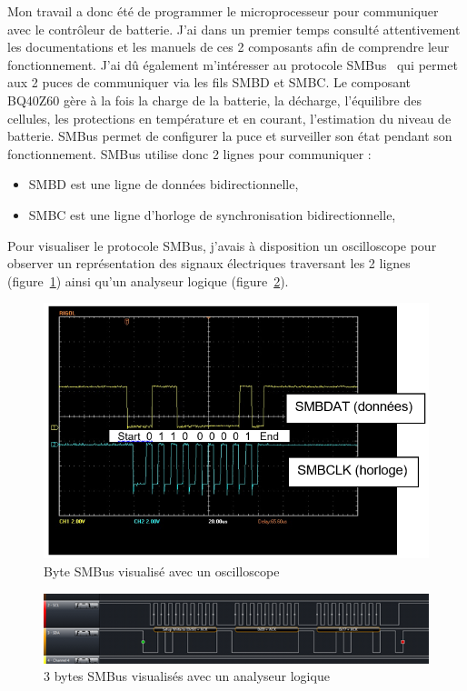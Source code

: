 \documentclass[a4paper, 12pt, sffamily]{report}
\begin{document}
Mon travail a donc été de programmer le microprocesseur pour communiquer avec le contrôleur de batterie. J’ai dans un premier temps consulté attentivement les documentations et les manuels de ces 2 composants afin de comprendre leur fonctionnement. J’ai dû également m’intéresser au protocole SMBus~\cite{smbus_spec} qui permet aux 2 puces de communiquer via les fils SMBD et SMBC.
Le composant BQ40Z60 gère à la fois la charge de la batterie, la décharge, l’équilibre des cellules, les protections en température et en courant, l’estimation du niveau de batterie. SMBus permet de configurer la puce et surveiller son état pendant son fonctionnement.
SMBus utilise donc 2 lignes pour communiquer :
\begin{itemize} %
\item SMBD est une ligne de données bidirectionnelle,
\item SMBC est une ligne d'horloge de synchronisation bidirectionnelle,
\end{itemize}

Pour visualiser le protocole SMBus, j’avais à disposition un oscilloscope pour observer un représentation des signaux électriques traversant les 2 lignes (figure~\ref{fig:SMBus_oscilloscope}) ainsi qu’un analyseur logique (figure~\ref{fig:SMBus_logic_analyser}).

\begin{figure}[H]
\centering
\includegraphics[scale=0.6]{figures/screenshots/SMBus_oscilloscope.png}
\caption{Byte SMBus visualisé avec un oscilloscope}
\label{fig:SMBus_oscilloscope}
\end{figure}

\begin{figure}[H]
\centering
\includegraphics[scale=0.9]{figures/screenshots/SMBus_logic_analyser.png}
\caption{3 bytes SMBus visualisés avec un analyseur logique}
\label{fig:SMBus_logic_analyser}
\end{figure}
\end{document}

